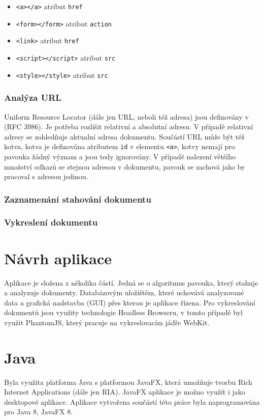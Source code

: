\begin{enumerate}
\begin{itemize}
	\item \texttt{<a></a>} atribut \texttt{href}
	\item \texttt{<form></form>} atribut \texttt{action}
	\item \texttt{<link>} atribut \texttt{href}
	\item \texttt{<script></script>} atribut \texttt{src}
	\item \texttt{<style></style>} atribut \texttt{src}
\end{itemize}

\subsection{Analýza URL}
Uniform Resource Locator (dále jen URL, neboli též adresa) jsou definovány v (RFC 3986). Je potřeba rozlišit relativní a absolutní adresu. V případě relativní adresy se zohledňuje aktualní adresa dokumentu. Součástí URL může být též kotva, kotva je definována atributem \texttt{id} v elementu \texttt{<a>}, kotvy nemají pro pavouka žádný význam a jsou tedy ignorovány. V případě nalezení většího množství odkazů se stejnou adresou v dokumentu, pavouk se zachová jako by pracoval s adresou jedinou.

\subsection{Zaznamenání stahování dokumentu}


\subsection{Vykreslení dokumentu}


\newpage
\chapter{Návrh aplikace}
Aplikace je složena z několika částí. Jedná se o algoritmus pavouka, který stahuje a analyzuje dokumenty. Databázovým uložištěm, které uchovává analyzované data a grafická nadstavba (GUI) přes kterou je aplikace řízena. Pro vykreslování dokumentů jsou využity technologie Headless Browseru, v tomto případě byl využit PhantomJS, který pracuje na vykreslovacím jádře WebKit.

\chapter{Java}
Byla využita platforma Java s platformou JavaFX, která umožňuje tvorbu Rich Internet Applications (dále jen RIA). JavaFX aplikace je možno využít i jako desktopové aplikace. Aplikace vytvořena součástí této práce byla naprogramována pro Java 8, JavaFX 8.


\end{enumerate}
